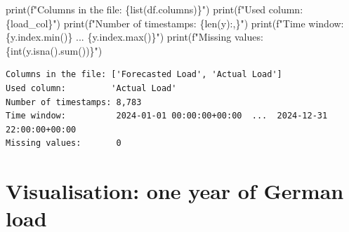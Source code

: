 \documentclass[
  english,
  letterpaper,
]{scrbook}
\newenvironment{Shaded}{\begin{snugshade}}{\end{snugshade}}
\newcommand{\BuiltInTok}[1]{\textcolor[rgb]{0.00,0.23,0.31}{#1}}
\newcommand{\NormalTok}[1]{\textcolor[rgb]{0.00,0.23,0.31}{#1}}
\newcommand{\SpecialCharTok}[1]{\textcolor[rgb]{0.37,0.37,0.37}{#1}}
\newcommand{\SpecialStringTok}[1]{\textcolor[rgb]{0.13,0.47,0.30}{#1}}
\begin{document}
\begin{Shaded}
\begin{Highlighting}[]
\BuiltInTok{print}\NormalTok{(}\SpecialStringTok{f"Columns in the file: }\SpecialCharTok{\{}\BuiltInTok{list}\NormalTok{(df.columns)}\SpecialCharTok{\}}\SpecialStringTok{"}\NormalTok{)}
\BuiltInTok{print}\NormalTok{(}\SpecialStringTok{f"Used column:         \textquotesingle{}}\SpecialCharTok{\{}\NormalTok{load\_col}\SpecialCharTok{\}}\SpecialStringTok{\textquotesingle{}"}\NormalTok{)}
\BuiltInTok{print}\NormalTok{(}\SpecialStringTok{f"Number of timestamps: }\SpecialCharTok{\{}\BuiltInTok{len}\NormalTok{(y)}\SpecialCharTok{:,\}}\SpecialStringTok{"}\NormalTok{)}
\BuiltInTok{print}\NormalTok{(}\SpecialStringTok{f"Time window:          }\SpecialCharTok{\{}\NormalTok{y}\SpecialCharTok{.}\NormalTok{index}\SpecialCharTok{.}\BuiltInTok{min}\NormalTok{()}\SpecialCharTok{\}}\SpecialStringTok{  ...  }\SpecialCharTok{\{}\NormalTok{y}\SpecialCharTok{.}\NormalTok{index}\SpecialCharTok{.}\BuiltInTok{max}\NormalTok{()}\SpecialCharTok{\}}\SpecialStringTok{"}\NormalTok{)}
\BuiltInTok{print}\NormalTok{(}\SpecialStringTok{f"Missing values:       }\SpecialCharTok{\{}\BuiltInTok{int}\NormalTok{(y.isna().}\BuiltInTok{sum}\NormalTok{())}\SpecialCharTok{\}}\SpecialStringTok{"}\NormalTok{)}
\end{Highlighting}
\end{Shaded}

\begin{verbatim}
Columns in the file: ['Forecasted Load', 'Actual Load']
Used column:         'Actual Load'
Number of timestamps: 8,783
Time window:          2024-01-01 00:00:00+00:00  ...  2024-12-31 22:00:00+00:00
Missing values:       0
\end{verbatim}

\section{Visualisation: one year of German
load}\label{visualisation-one-year-of-german-load}
\end{document}
